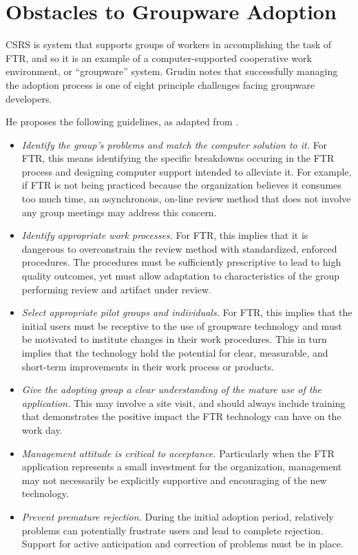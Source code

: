 
\section{Obstacles to Groupware Adoption}

CSRS is system that supports groups of workers in accomplishing the task of
FTR, and so it is an example of a computer-supported cooperative work
environment, or ``groupware'' system.  Grudin \cite{Grudin94} notes that
successfully managing the adoption process is one of eight principle
challenges facing groupware developers. 

He proposes the following guidelines, as adapted from
\cite{Perin91,Erlich87}. 

\begin{itemize}

\item {\em Identify the group's problems and match the computer solution to it.}
  For FTR, this means identifying the specific breakdowns occuring in the FTR
  process and designing computer support intended to alleviate it. For
  example, if FTR is not being practiced because the organization believes
  it consumes too much time, an asynchronous, on-line review method that
  does not involve any group meetings may address this concern.

\item {\em Identify {\em appropriate} work processes.} For FTR, this
  implies that it is dangerous to overconstrain the review method with
  standardized, enforced procedures.  The procedures must be sufficiently
  prescriptive to lead to high quality outcomes, yet must allow adaptation
  to characteristics of the group performing review and artifact under review.

\item {\em Select appropriate pilot groups and individuals.} For FTR,
  this implies that the initial users must be receptive to the use of
  groupware technology and must be motivated to institute changes in
  their work procedures.  This in turn implies that the technology hold
  the potential for clear, measurable, and short-term improvements in
  their work process or products.

\item {\em Give the adopting group a clear understanding of the mature
  use of the application.}  This may involve a site visit, and should
  always include training that demonstrates the positive impact the FTR
  technology can have on the work day.

\item {\em Management attitude is critical to acceptance.} Particularly
  when the FTR application represents a small investment for the
  organization, management may not necessarily be explicitly supportive and
  encouraging of the new technology.  

\item {\em Prevent premature rejection.}  During the initial adoption
  period, relatively problems can potentially frustrate users and lead to
  complete rejection.  Support for active anticipation and correction of
  problems must be in place.

\end{itemize}
